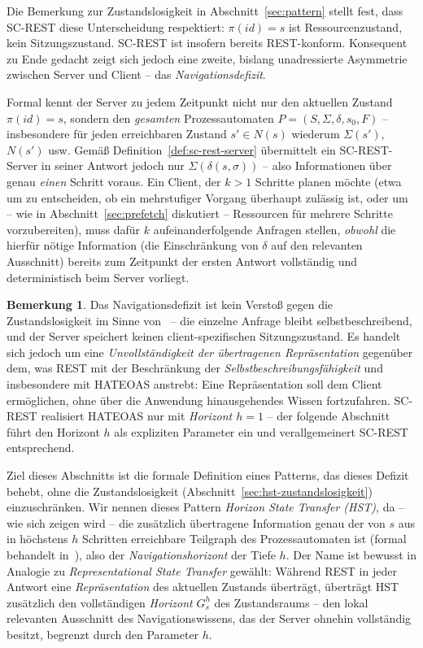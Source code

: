 ﻿\documentclass[a4paper,12pt]{article}
\theoremstyle{definition}
\newtheorem{bemerkung}{Bemerkung}
\begin{document}
Die Bemerkung zur Zustandslosigkeit in Abschnitt~\ref{sec:pattern} stellt fest, dass
SC-REST diese Unterscheidung respektiert: $\pi(id)=s$ ist Ressourcenzustand, kein
Sitzungszustand. SC-REST ist insofern bereits REST-konform. Konsequent zu Ende gedacht
zeigt sich jedoch eine zweite, bislang unadressierte Asymmetrie zwischen Server und
Client -- das \emph{Navigationsdefizit}.

Formal kennt der Server zu jedem Zeitpunkt nicht nur den aktuellen Zustand
$\pi(id)=s$, sondern den \emph{gesamten} Prozessautomaten
$P=(S,\Sigma,\delta,s_0,F)$ -- insbesondere für jeden erreichbaren Zustand $s'\in N(s)$
wiederum $\Sigma(s')$, $N(s')$ usw. Gemäß Definition~\ref{def:sc-rest-server} übermittelt
ein SC-REST-Server in seiner Antwort jedoch nur $\Sigma(\delta(s,\sigma))$ -- also
Informationen über genau \emph{einen} Schritt voraus. Ein Client, der $k>1$ Schritte
planen möchte (etwa um zu entscheiden, ob ein mehrstufiger Vorgang überhaupt zulässig
ist, oder um -- wie in Abschnitt~\ref{sec:prefetch} diskutiert -- Ressourcen für mehrere
Schritte vorzubereiten), muss dafür $k$ aufeinanderfolgende Anfragen stellen,
\emph{obwohl} die hierfür nötige Information (die Einschränkung von $\delta$ auf den
relevanten Ausschnitt) bereits zum Zeitpunkt der ersten Antwort vollständig und
deterministisch beim Server vorliegt.

\begin{bemerkung}
	\label{bem:navigationsdefizit}
	Das Navigationsdefizit ist kein Verstoß gegen die Zustandslosigkeit im Sinne
	von~\cite{fielding2000} -- die einzelne Anfrage bleibt selbstbeschreibend, und der
	Server speichert keinen client-spezifischen Sitzungszustand. Es handelt sich jedoch
	um eine \emph{Unvollständigkeit der übertragenen Repräsentation} gegenüber dem, was
	REST mit der Beschränkung der \emph{Selbstbeschreibungsfähigkeit} und insbesondere
	mit HATEOAS anstrebt: Eine Repräsentation soll dem Client ermöglichen, ohne über die
	Anwendung hinausgehendes Wissen fortzufahren. SC-REST realisiert HATEOAS nur mit
	\emph{Horizont $h=1$} -- der folgende Abschnitt führt den Horizont $h$ als expliziten
	Parameter ein und verallgemeinert SC-REST entsprechend.
\end{bemerkung}

Ziel dieses Abschnitts ist die formale Definition eines Patterns, das dieses Defizit
behebt, ohne die Zustandslosigkeit (Abschnitt~\ref{sec:hst-zustandslosigkeit})
einzuschränken. Wir nennen dieses Pattern \emph{Horizon State Transfer (HST)}, da --
wie sich zeigen wird -- die zusätzlich übertragene Information genau der von $s$ aus in
höchstens $h$ Schritten erreichbare Teilgraph des Prozessautomaten ist
(formal behandelt in~\cite{epp2026subgraph}), also der \emph{Navigationshorizont} der
Tiefe $h$. Der Name ist bewusst in Analogie zu \emph{Representational State Transfer}
gewählt: Während REST in jeder Antwort eine \emph{Repräsentation} des aktuellen Zustands
überträgt, überträgt HST zusätzlich den vollständigen \emph{Horizont} $G_s^h$ des
Zustandsraums -- den lokal relevanten Ausschnitt des Navigationswissens, das der Server
ohnehin vollständig besitzt, begrenzt durch den Parameter $h$.
\end{document}
